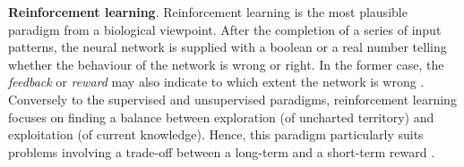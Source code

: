 \documentclass[12pt, a4paper, twoside, openright, notitlepage]{report}
\numberwithin{equation}{chapter}
\theoremstyle{theorem}
\theoremstyle{definition}
\theoremstyle{remark}
\theoremstyle{proposition}
\numberwithin{figure}{chapter}
\begin{document}
		\vspace*{0.3cm}
		
		\noindent \textbf{Reinforcement learning}. Reinforcement learning is the most plausible paradigm from a biological viewpoint. After the completion of a series of input patterns, the neural network is supplied with a boolean or a real number telling whether the behaviour of the network is wrong or right. In the former case, the \emph{feedback} or \emph{reward} may also indicate to which extent the network is wrong \cite{Kri07}. Conversely to the supervised and unsupervised paradigms, reinforcement learning focuses on finding a balance between exploration (of uncharted territory) and exploitation (of current knowledge). Hence, this paradigm particularly suits problems involving a trade-off between a long-term and a short-term reward \cite{KLM96}.
		
		\vspace*{0.3cm}
		
\end{document}
